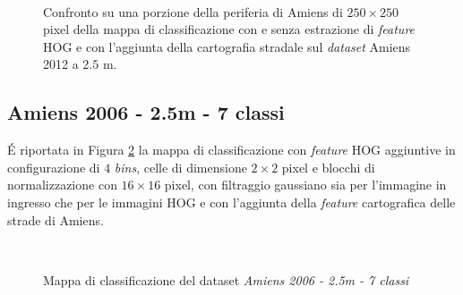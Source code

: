 \begin{figure}[!ht]

\center


\hspace{3mm}

\\


\caption{Confronto su una porzione della periferia di Amiens di
$250\times250$ pixel della mappa di classificazione con e senza
estrazione di \emph{feature} HOG e con l'aggiunta della cartografia
stradale sul \emph{dataset} Amiens 2012 a $2.5$ m. }

\label{fig:confrontoAmiens2012_2_5m}

\end{figure}

\clearpage

\subsection{Amiens 2006 - 2.5m - 7 classi}

\'E riportata in Figura \ref{fig:ClassMap_Amiens2006_2_5m_roadsandhog}
la mappa di classificazione con \emph{feature} HOG aggiuntive in
configurazione di $4$ \emph{bins}, celle di dimensione $2\times2$
pixel e blocchi di normalizzazione con $16\times16$ pixel, con
filtraggio gaussiano sia per l'immagine in ingresso che per le
immagini HOG e con l'aggiunta della \emph{feature} cartografica delle
strade di Amiens.

\begin{figure}[!ht]

\center
{}
\\

\caption{Mappa di classificazione del dataset \emph{Amiens 2006 - 2.5m
- 7 classi}}

\label{fig:ClassMap_Amiens2006_2_5m_roadsandhog}

\end{figure}

